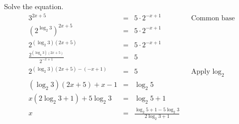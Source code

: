 \begin{frame}
\begin{example}
Solve the equation.
\[
\renewcommand{\arraystretch}{1.7}
\begin{array}{rcll|l}
\displaystyle 3^{2x+5}&=&\displaystyle 5\cdot 2^{-x+1} &&\text{Common base}\\
\displaystyle \left( 2^{\log_2 3}\right)^{2x+5}&=&\displaystyle 5\cdot 2^{-x+1} \\
\displaystyle 2^{\left(\log_2 3\right)(2x+5)}&=&\displaystyle 5\cdot 2^{-x+1}\\
\displaystyle \frac{2^{\left(\log_2 3\right)(2x+5)}}{2^{- x+1}}&=&\displaystyle 5\\
\displaystyle 2^{\left( \log_2 3\right)(2x+5)- (-x+1)}&=& \displaystyle 5 && \text{Apply }\log_2 \\
\displaystyle (\log_2 3)(2x+5)+x-1&=&\log_2 5\\
x(2\log_2 3+1)+ 5\log_2 3&=&\displaystyle \log_2 5+1\\
\displaystyle x&=&\displaystyle \frac{\log_2 5+1-5\log_2 3}{2 \log_2 3+1}\\

\end{array}
\]
\end{example}
\end{frame}
